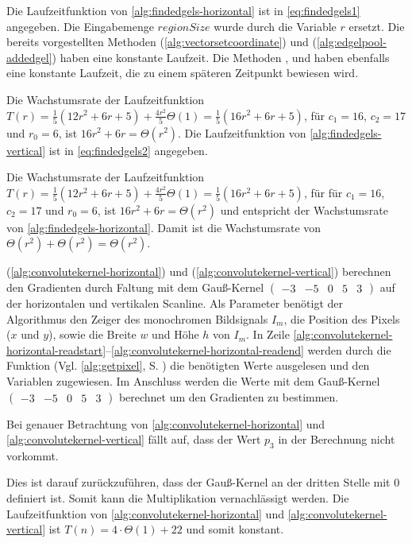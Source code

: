 Die Laufzeitfunktion von \autoref{alg:findedgels-horizontal} ist in \autoref{eq:findedgels1} angegeben. Die Eingabemenge
 $\mathit{regionSize}$ wurde durch die Variable $r$ ersetzt. Die bereits vorgestellten Methoden
  (\autoref{alg:vectorsetcoordinate}) und 
 (\autoref{alg:edgelpool-addedgel}) haben eine konstante Laufzeit. Die Methoden ,
  und  haben ebenfalls eine konstante Laufzeit, die zu einem
 späteren Zeitpunkt bewiesen wird.

Die Wachstumsrate der Laufzeitfunktion $T(r) = \tfrac{1}{5} (12r^2 + 6r + 5) + \frac{4r^2}{5}\Theta(1)
 = \tfrac{1}{5} (16r^2 + 6r + 5)$, für $c_{1} = 16$, $c_{2} = 17$ und $r_{0} = 6$, ist $16r^2 + 6r = \Theta(r^2)$. Die
 Laufzeitfunktion von \autoref{alg:findedgels-vertical} ist in \autoref{eq:findedgels2} angegeben.

Die Wachstumsrate der Laufzeitfunktion $T(r) = \tfrac{1}{5} (12r^2 + 6r + 5) + \frac{4r^2}{5}\Theta(1)
 = \tfrac{1}{5} (16r^2 + 6r + 5)$, für für $c_{1} = 16$, $c_{2} = 17$ und $r_{0} = 6$, ist $16r^2 + 6r = \Theta(r^2)$
 und entspricht der Wachstumsrate von \autoref{alg:findedgels-horizontal}. Damit ist die Wachstumsrate von  $\Theta(r^2) + \Theta(r^2) = \Theta(r^2)$.

 (\autoref{alg:convolutekernel-horizontal}) und 
 (\autoref{alg:convolutekernel-vertical}) berechnen den Gradienten durch Faltung mit dem Gauß-Kernel
$\left( \begin{smallmatrix}
-3& -5& 0& 5& 3
\end{smallmatrix} \right)$
auf der horizontalen und vertikalen Scanline. Als Parameter benötigt der Algorithmus den Zeiger des monochromen
 Bildsignals $I_m$, die Position des Pixels ($x$ und $y$), sowie die Breite $w$ und Höhe $h$ von $I_m$. In Zeile
 \ref{alg:convolutekernel-horizontal-readstart}--\ref{alg:convolutekernel-horizontal-readend} werden durch die
 Funktion  (Vgl. \autoref{alg:getpixel}, S. \pageref{alg:getpixel}) die benötigten Werte
 ausgelesen und den Variablen zugewiesen. Im Anschluss werden die Werte mit dem Gauß-Kernel
$\left( \begin{smallmatrix}
-3& -5& 0& 5& 3
\end{smallmatrix} \right)$
berechnet um den Gradienten zu bestimmen.

Bei genauer Betrachtung von \autoref{alg:convolutekernel-horizontal} und \autoref{alg:convolutekernel-vertical}
 fällt auf, dass der Wert $p_3$ in der Berechnung nicht vorkommt.

Dies ist darauf zurückzuführen, dass der Gauß-Kernel an der dritten Stelle mit $0$ definiert ist. Somit kann die
 Multiplikation vernachlässigt werden. Die Laufzeitfunktion von \autoref{alg:convolutekernel-horizontal} und
 \autoref{alg:convolutekernel-vertical} ist $T(n) = 4 \cdot \Theta(1) + 22$ und somit konstant.


